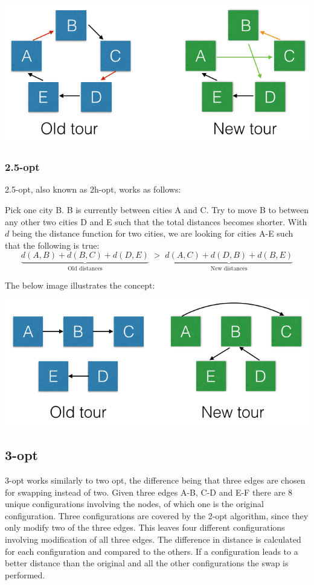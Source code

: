 \documentclass[paper=a4, fontsize=11pt,numbers=endperiod]{scrartcl} %
\numberwithin{equation}{section} %
\numberwithin{figure}{section} %
\numberwithin{table}{section} %
\begin{document}
\begin{center}
\includegraphics[scale=0.4]{2opt}
\end{center}

\subsubsection{2.5-opt}
2.5-opt, also known as 2h-opt, works as follows:

Pick one city B. B is currently between cities A and C. Try to move B to between any other two cities D and E such that the total distances becomes shorter. With $d$ being the distance function for two cities, we are looking for cities A-E such that the following is true:
\[
    \underbrace{d(A,B) + d(B,C) + d(D,E)}_\text{Old distances}\; > \;\underbrace{d(A,C) + d(D,B) + d(B,E)}_\text{New distances}
\]

The below image illustrates the concept:

\begin{center}
\includegraphics[scale=0.4]{25opt}
\end{center}

\subsection{3-opt}
3-opt works similarly to two opt, the difference being that three edges are chosen for swapping instead of two.
Given three edges A-B, C-D and E-F there are 8 unique configurations involving the nodes, of which one is the original configuration.
Three configurations are covered by the 2-opt algorithm, since they only modify two of the three edges.
This leaves four different configurations involving modification of all three edges.
The difference in distance is calculated for each configuration and compared to the others.
If a configuration leads to a better distance than the original and all the other configurations the swap is performed.
\end{document}
